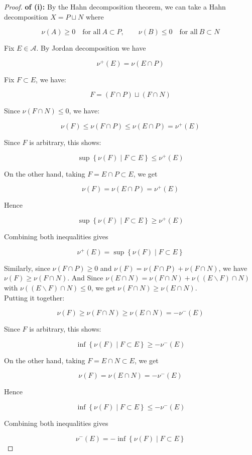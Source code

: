 \documentclass{qlnotes-export}
\begin{document}
\begin{proof}

\textbf{of (i):} By the Hahn decomposition theorem, we can take a Hahn decomposition \(X = P \sqcup N\) where

\[\nu(A) \geq 0\quad\text{for all}\ A \subset P,\qquad\nu(B) \leq 0\quad\text{for all}\ B \subset N\]

Fix \(E \in \mathcal{A}\). By Jordan decomposition we have

\[\nu^{+}(E) = \nu(E \cap P)\]

Fix \(F \subset E\), we have:

\[F = (F \cap P) \sqcup (F \cap N)\]

Since \(\nu(F \cap N) \leq 0\), we have:

\[\nu(F) \leq \nu(F \cap P) \leq \nu(E \cap P) = \nu^{+}(E)\]

Since \(F\) is arbitrary, this shows:

\[\sup\left\{ {\nu(F) \mid F \subset E} \right\} \leq \nu^{+}(E)\]

On the other hand, taking \(F = E \cap P \subset E\), we get

\[\nu(F) = \nu(E \cap P) = \nu^{+}(E)\]

Hence

\[\sup\left\{ {\nu(F) \mid F \subset E} \right\} \geq \nu^{+}(E)\]

Combining both inequalities gives

\[\nu^{+}(E) = \sup\left\{ {\nu(F) \mid F \subset E} \right\}\]

Similarly, since \(\nu(F \cap P) \geq 0\) and \(\nu(F) = \nu(F \cap P) + \nu(F \cap N)\), we have \(\nu(F) \geq \nu(F \cap N)\). And Since \(\nu(E \cap N) = \nu(F \cap N) + \nu((E\backslash F) \cap N)\) with \(\nu((E\backslash F) \cap N) \leq 0\), we get \(\nu(F \cap N) \geq \nu(E \cap N)\).\\
Putting it together:

\[\nu(F) \geq \nu(F \cap N) \geq \nu(E \cap N) = - \nu^{-}(E)\]

Since \(F\) is arbitrary, this shows:

\[\inf\left\{ {\nu(F) \mid F \subset E} \right\} \geq - \nu^{-}(E)\]

On the other hand, taking \(F = E \cap N \subset E\), we get

\[\nu(F) = \nu(E \cap N) = - \nu^{-}(E)\]

Hence

\[\inf\left\{ {\nu(F) \mid F \subset E} \right\} \leq - \nu^{-}(E)\]

Combining both inequalities gives

\[\nu^{-}(E) = - \inf\left\{ {\nu(F) \mid F \subset E} \right\}\]

\end{proof}
\end{document}
